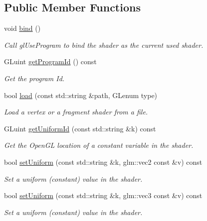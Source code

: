 \subsection*{Public Member Functions}
\begin{DoxyCompactItemize}
\item 
\hypertarget{classgdl_1_1_a_shader_a51ce5fd5c2f0afcda913a44ab68ab32b}{void \hyperlink{classgdl_1_1_a_shader_a51ce5fd5c2f0afcda913a44ab68ab32b}{bind} ()}\label{classgdl_1_1_a_shader_a51ce5fd5c2f0afcda913a44ab68ab32b}

\begin{DoxyCompactList}\small\item\em Call gl\-Use\-Program to bind the shader as the current used shader. \end{DoxyCompactList}\item 
G\-Luint \hyperlink{classgdl_1_1_a_shader_af1ed529201e3a16301b3ab0f6d592d54}{get\-Program\-Id} () const 
\begin{DoxyCompactList}\small\item\em Get the program Id. \end{DoxyCompactList}\item 
bool \hyperlink{classgdl_1_1_a_shader_ae292aeb4a9ebf03d2427ba9f44d50136}{load} (const std\-::string \&path, G\-Lenum type)
\begin{DoxyCompactList}\small\item\em Load a vertex or a fragment shader from a file. \end{DoxyCompactList}\item 
G\-Luint \hyperlink{classgdl_1_1_a_shader_a291f4bb70e4374b8a081a57a21e1fe28}{get\-Uniform\-Id} (const std\-::string \&k) const 
\begin{DoxyCompactList}\small\item\em Get the Open\-G\-L location of a constant variable in the shader. \end{DoxyCompactList}\item 
bool \hyperlink{classgdl_1_1_a_shader_ae71efb1e61476a56eb5d4fec32d5d1fa}{set\-Uniform} (const std\-::string \&k, glm\-::vec2 const \&v) const 
\begin{DoxyCompactList}\small\item\em Set a uniform (constant) value in the shader. \end{DoxyCompactList}\item 
bool \hyperlink{classgdl_1_1_a_shader_a4cfe07c7cacb131d08053b2999b3135f}{set\-Uniform} (const std\-::string \&k, glm\-::vec3 const \&v) const 
\begin{DoxyCompactList}\small\item\em Set a uniform (constant) value in the shader. \end{DoxyCompactList}\item 

\end{DoxyCompactItemize}
